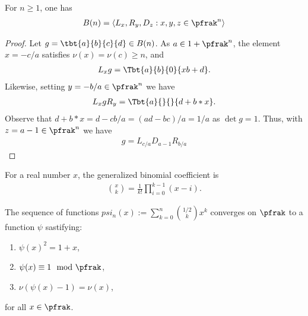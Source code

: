 \begin{lemma}
  For $n\geq 1$, one has
  \begin{align*}
    B(n)=\langle L_x,R_y,D_z : x,y,z \in \pfrak^n \rangle
  \end{align*}
\end{lemma}
\begin{proof}
  Let $g = \tbt{a}{b}{c}{d} \in B(n)$. As $a \in 1+\pfrak^n$, the element $x = -c/a$ satisfies $\nu(x)=\nu(c)\geq n$, and
  \begin{align*}
    L_x g = \Tbt{a}{b}{0}{xb+d}.
  \end{align*}
  Likewise, setting $y = -b/a \in \pfrak^n$ we have
  \begin{align*}
    L_x g R_y = \Tbt{a}{}{}{d+b*x}.
  \end{align*}
  Observe that $d+b*x = d -cb/a = (ad-bc)/a =1/a$ as $\det g =1$. Thus, with $z = a-1 \in \pfrak^n$ we have
  \begin{align*}
    g = L_{c/a}D_{a-1}R_{b/a}
  \end{align*}
\end{proof}

For a real number $x$, the generalized binomial coefficient is
\begin{align*}
  {x \choose k} =\frac{1}{k !} \prod_{i=0}^{k-1}\left(x-i\right).
\end{align*}

\begin{lemma}
  The sequence of functions $psi_n(x):=\sum_{k=0}^n{1/2 \choose k} x^k$ converges on $\pfrak$ to a function $\psi$ sastifying:
  \begin{enumerate}
    \item $\psi(x)^2 = 1+x$,
    \item $\psi(x) \equiv 1 \mod \pfrak$,
    \item $\nu(\psi(x)-1)=\nu(x)$,
  \end{enumerate}
  for all $x\in \pfrak$.
\end{lemma}

